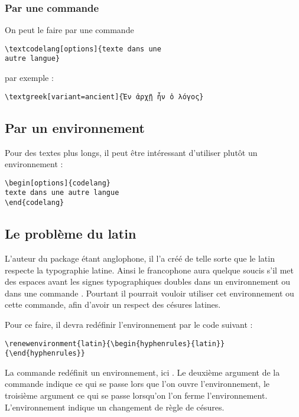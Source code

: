 \subsubsection{Par une commande}

On peut le faire par une commande 
\begin{verbatim}
\textcodelang[options]{texte dans une
autre langue}
\end{verbatim}

 par exemple : 

\begin{verbatim}
\textgreek[variant=ancient]{Ἐν ἀρχῇ ἦν ὁ λόγος}
\end{verbatim}

\subsection{Par un environnement}

Pour des textes plus longs, il peut être intéressant d'utiliser plutôt un environnement :

\begin{verbatim}
\begin[options]{codelang}
texte dans une autre langue
\end{codelang}
\end{verbatim}

\subsection{Le problème du latin}

L'auteur du package  étant anglophone, il l'a créé de telle sorte que le latin respecte la typographie latine. Ainsi le francophone aura quelque soucis s'il met des espaces avant les signes typographiques doubles dans un environnement  ou dans une commande .
Pourtant il pourrait vouloir utiliser cet environnement ou cette commande, afin d'avoir un respect des césures latines.

Pour ce faire, il devra redéfinir l'environnement  par le code suivant :

\begin{verbatim}
\renewenvironment{latin}{\begin{hyphenrules}{latin}}{\end{hyphenrules}}
\end{verbatim}

\begin{anedocte}
La commande  redéfinit un environnement, ici . Le deuxième argument de la commande indique ce qui se passe lors que l'on ouvre l'environnement, le troisième argument ce qui se passe lorsqu'on l'on ferme l'environnement. L'environnement  indique un changement de règle de césures.
\end{anedocte}


